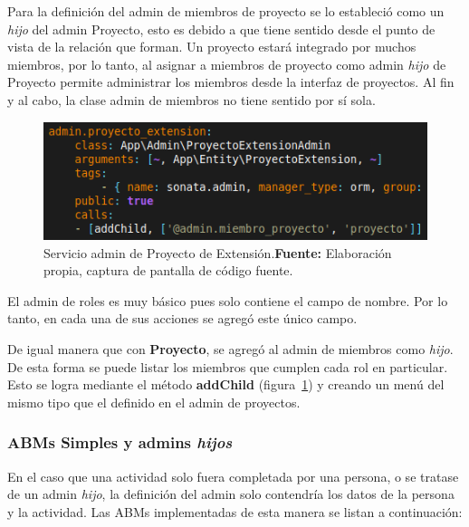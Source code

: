 Para la definición del admin de miembros de proyecto se lo estableció como un \textit{hijo} del admin Proyecto, esto es debido a que tiene sentido desde el punto
de vista de la relación que forman. Un proyecto estará integrado por muchos miembros, por lo tanto, al asignar a miembros de proyecto como admin \textit{hijo}
de Proyecto permite administrar los miembros desde la interfaz de proyectos. Al fin y al cabo, la clase admin de miembros no tiene sentido por sí sola.



\begin{figure}[H]
    \includegraphics[width=1\linewidth]{image/addChild.png}
    \caption[Servicio admin de Proyecto de Extensión]{Servicio admin de Proyecto de Extensión.\newline \textbf{Fuente:} Elaboración propia, captura de pantalla de código fuente.}
    \label{fig:image/addChild}
\end{figure}

%

El admin de roles es muy básico pues solo contiene el campo de nombre. Por lo tanto, en cada una de sus acciones se agregó este único campo.


De igual manera que con \textbf{Proyecto}, se agregó al admin de miembros como \textit{hijo}. De esta forma se puede listar los miembros que cumplen cada rol en
particular.
Esto se logra mediante el método \textbf{addChild} (figura~\ref{fig:image/addChild}) y creando un menú del mismo tipo que el definido en el admin de proyectos.

\subsubsection{ABMs Simples y admins \textit{hijos}}%
\label{ssub:ambs_simples}

En el caso que una actividad solo fuera completada por una persona, o se tratase de un admin \textit{hijo}, la definición del admin solo contendría los
datos de la persona y la actividad\@. Las ABMs implementadas de esta manera se listan a continuación:

